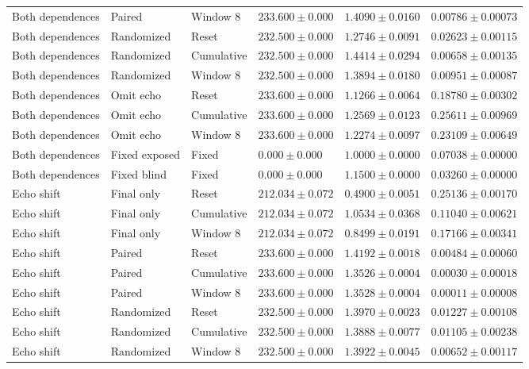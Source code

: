 \begin{longtable}{@{}llllll@{}}
Both dependences & Paired & Window 8 & $233.600 \pm 0.000$ & $1.4090 \pm 0.0160$ & $0.00786 \pm 0.00073$ \\
Both dependences & Randomized & Reset & $232.500 \pm 0.000$ & $1.2746 \pm 0.0091$ & $0.02623 \pm 0.00115$ \\
Both dependences & Randomized & Cumulative & $232.500 \pm 0.000$ & $1.4414 \pm 0.0294$ & $0.00658 \pm 0.00135$ \\
Both dependences & Randomized & Window 8 & $232.500 \pm 0.000$ & $1.3894 \pm 0.0180$ & $0.00951 \pm 0.00087$ \\
Both dependences & Omit echo & Reset & $233.600 \pm 0.000$ & $1.1266 \pm 0.0064$ & $0.18780 \pm 0.00302$ \\
Both dependences & Omit echo & Cumulative & $233.600 \pm 0.000$ & $1.2569 \pm 0.0123$ & $0.25611 \pm 0.00969$ \\
Both dependences & Omit echo & Window 8 & $233.600 \pm 0.000$ & $1.2274 \pm 0.0097$ & $0.23109 \pm 0.00649$ \\
Both dependences & Fixed exposed & Fixed & $0.000 \pm 0.000$ & $1.0000 \pm 0.0000$ & $0.07038 \pm 0.00000$ \\
Both dependences & Fixed blind & Fixed & $0.000 \pm 0.000$ & $1.1500 \pm 0.0000$ & $0.03260 \pm 0.00000$ \\
Echo shift & Final only & Reset & $212.034 \pm 0.072$ & $0.4900 \pm 0.0051$ & $0.25136 \pm 0.00170$ \\
Echo shift & Final only & Cumulative & $212.034 \pm 0.072$ & $1.0534 \pm 0.0368$ & $0.11040 \pm 0.00621$ \\
Echo shift & Final only & Window 8 & $212.034 \pm 0.072$ & $0.8499 \pm 0.0191$ & $0.17166 \pm 0.00341$ \\
Echo shift & Paired & Reset & $233.600 \pm 0.000$ & $1.4192 \pm 0.0018$ & $0.00484 \pm 0.00060$ \\
Echo shift & Paired & Cumulative & $233.600 \pm 0.000$ & $1.3526 \pm 0.0004$ & $0.00030 \pm 0.00018$ \\
Echo shift & Paired & Window 8 & $233.600 \pm 0.000$ & $1.3528 \pm 0.0004$ & $0.00011 \pm 0.00008$ \\
Echo shift & Randomized & Reset & $232.500 \pm 0.000$ & $1.3970 \pm 0.0023$ & $0.01227 \pm 0.00108$ \\
Echo shift & Randomized & Cumulative & $232.500 \pm 0.000$ & $1.3888 \pm 0.0077$ & $0.01105 \pm 0.00238$ \\
Echo shift & Randomized & Window 8 & $232.500 \pm 0.000$ & $1.3922 \pm 0.0045$ & $0.00652 \pm 0.00117$ \\

\end{longtable}
